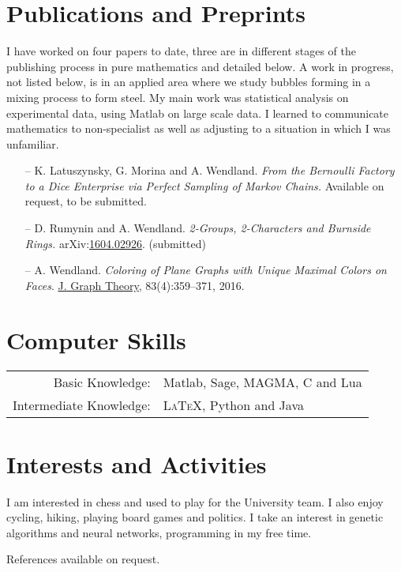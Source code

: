 \documentclass[a4paper,10pt]{article}
\begin{document}
\section{Publications and Preprints}
\footnotesize{I have worked on four papers to date, three are in different stages of the publishing process in pure mathematics and detailed below. A work in progress, not listed below, is in an applied area where we study bubbles forming in a mixing process to form steel. My main work was statistical analysis on experimental data, using Matlab on large scale data. I learned to communicate mathematics to non-specialist as well as adjusting to a situation in which I was unfamiliar.} 
\begin{itemize}
	\item[--] 
	K. Latuszynsky, G. Morina and A. Wendland. \emph{From the Bernoulli Factory to a Dice Enterprise via Perfect Sampling of Markov Chains.} Available on request, to be submitted.
	\item[--]
	D. Rumynin and A. Wendland. \emph{2-Groups, 2-Characters and Burnside Rings.} arXiv:\href{https://arxiv.org/abs/1604.02926}{1604.02926}. (submitted)
	\item[--]
	A. Wendland. \emph{Coloring of Plane Graphs with Unique Maximal Colors on Faces}. \href{http://onlinelibrary.wiley.com/doi/10.1002/jgt.22002/abstract}{J. Graph Theory}, 83(4):359–371, 2016.
\end{itemize}

\section{Computer Skills}
\begin{tabular}{rl}
 Basic Knowledge:& Matlab, Sage, \textsc{MAGMA}, C and Lua\\
Intermediate Knowledge:&  \textsc{LaTeX}, Python and Java\\
\end{tabular}

\section{Interests and Activities}
I am interested in chess and used to play for the University team. I also enjoy cycling, hiking, playing board games and politics. I take an interest in genetic algorithms and neural networks, programming in my free time.\\

\begin{center}
	References available on request.
\end{center}
\end{document}
